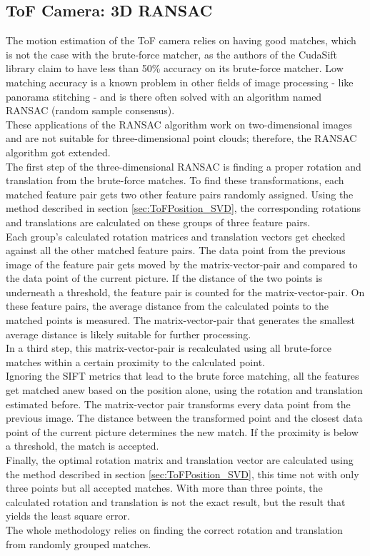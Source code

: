 \subsection{ToF Camera: 3D RANSAC}
\label{sec:ToFPosition_RANSAC}
The motion estimation of the ToF camera relies on having good matches, which is not the case with the brute-force matcher, as the authors of the CudaSift library claim to have less than 50\% accuracy on its brute-force matcher.\cite{cudaSiftRepo} Low matching accuracy is a known problem in other fields of image processing - like panorama stitching - and is there often solved with an algorithm named RANSAC (random sample consensus).\\
These applications of the RANSAC algorithm work on two-dimensional images and are not suitable for three-dimensional point clouds; therefore, the RANSAC algorithm got extended.\\
The first step of the three-dimensional RANSAC is finding a proper rotation and translation from the brute-force matches. To find these transformations, each matched feature pair gets two other feature pairs randomly assigned. Using the method described in section \ref{sec:ToFPosition_SVD}, the corresponding rotations and translations are calculated on these groups of three feature pairs.\\
Each group's calculated rotation matrices and translation vectors get checked against all the other matched feature pairs. The data point from the previous image of the feature pair gets moved by the matrix-vector-pair and compared to the data point of the current picture. If the distance of the two points is underneath a threshold, the feature pair is counted for the matrix-vector-pair. On these feature pairs, the average distance from the calculated points to the matched points is measured. The matrix-vector-pair that generates the smallest average distance is likely suitable for further processing.\\ In a third step, this matrix-vector-pair is recalculated using all brute-force matches within a certain proximity to the calculated point.\\
Ignoring the SIFT metrics that lead to the brute force matching, all the features get matched anew based on the position alone, using the rotation and translation estimated before. The matrix-vector pair transforms every data point from the previous image. The distance between the transformed point and the closest data point of the current picture determines the new match. If the proximity is below a threshold, the match is accepted.\\
Finally, the optimal rotation matrix and translation vector are calculated using the method described in section \ref{sec:ToFPosition_SVD}, this time not with only three points but all accepted matches. With more than three points, the calculated rotation and translation is not the exact result, but the result that yields the least square error.\cite{SVD_ETH}\\
The whole methodology relies on finding the correct rotation and translation from randomly grouped matches. 

